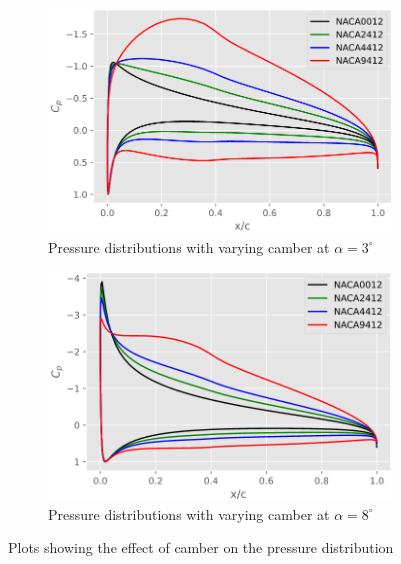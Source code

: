 \begin{figure}[h]
    \centering
    \begin{subfigure}{.5\textwidth}
      \centering
      \captionsetup{width=.8\linewidth}
      \includegraphics[width=.9\linewidth]{static/camber_a3.png}
      \caption{\centering Pressure distributions with varying camber at $\alpha = 3^{\circ}$}
      \label{fig:camber1}
    \end{subfigure}\hfill%
    \begin{subfigure}{.5\textwidth}
      \centering
      \captionsetup{width=.9\linewidth}
      \includegraphics[width=.9\linewidth]{static/camber_a8.png}
      \caption{\centering Pressure distributions with varying camber at $\alpha = 8^{\circ}$}
      \label{fig:camber2}
    \end{subfigure}
    \caption{\centering Plots showing the effect of camber on the pressure distribution}
    \label{fig:camber}
\end{figure}

